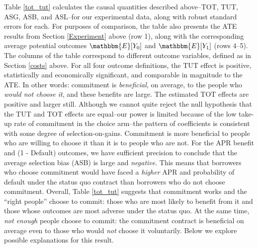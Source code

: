 \documentclass[oneside,11pt]{article}
\begin{document}
Table \ref{tot_tut} calculates the causal quantities described above--TOT, TUT, ASG, ASB, and ASL--for our experimental data, along with robust standard errors for each. 
For purposes of comparison, the table also presents the ATE results from Section \ref{Experiment} above (row 1), along with the corresponding average potential outcomes $\mathbbm{E}[Y_0]$ and $\mathbbm{E}[Y_1]$ (rows 4--5).
The columns of the table correspond to different outcome variables, defined as in Section \ref{costs} above.
For all four outcome definitions, the TUT effect is positive, statistically and economically significant, and comparable in magnitude to the ATE.
In other words: commitment is \emph{beneficial}, on average, to the people who \emph{would not choose it}, and these benefits are large.
The estimated TOT effects are positive and larger still.
Although we cannot quite reject the null hypothesis that the TUT and TOT effects are equal--our power is limited because of the low take-up rate of commitment in the choice arm--the pattern of coefficients is consistent with some degree of selection-on-gains.
Commitment is more beneficial to people who are willing to choose it than it is to people who are not.
For the APR benefit and (1 - Default) outcomes, we have sufficient precision to conclude that the average selection bias (ASB) is large and \emph{negative}.
This means that borrowers who choose commitment would have faced a \emph{higher} APR and probability of default under the status quo contract than borrowers who do not choose commitment. 
Overall, Table \ref{tot_tut} suggests that commitment works and the ``right people'' choose to commit: those who are most likely to benefit from it and those whose outcomes are most adverse under the status quo. At the same time, \emph{not enough} people choose to commit: the commitment contract is beneficial on average even to those who would \emph{not} choose it voluntarily. Below we explore possible explanations for this result.
\end{document}
